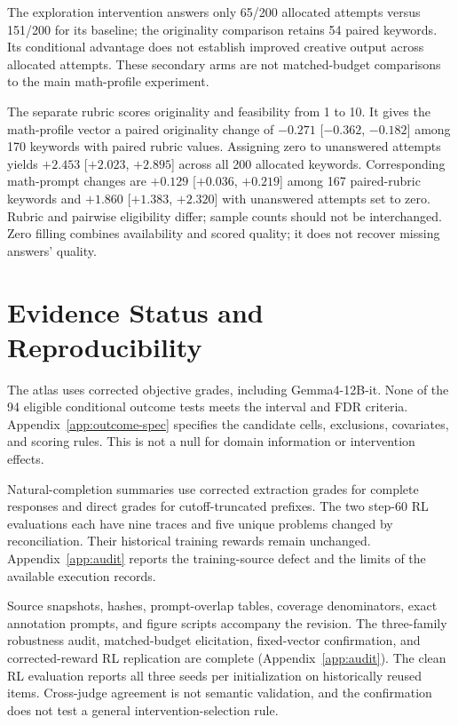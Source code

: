 The exploration intervention answers only 65/200 allocated attempts versus 151/200 for its baseline; the originality comparison retains 54 paired keywords. Its conditional advantage does not establish improved creative output across allocated attempts. These secondary arms are not matched-budget comparisons to the main math-profile experiment.

The separate rubric scores originality and feasibility from 1 to 10. It gives the math-profile vector a paired originality change of $-0.271$ [$-0.362$, $-0.182$] among 170 keywords with paired rubric values. Assigning zero to unanswered attempts yields $+2.453$ [$+2.023$, $+2.895$] across all 200 allocated keywords. Corresponding math-prompt changes are $+0.129$ [$+0.036$, $+0.219$] among 167 paired-rubric keywords and $+1.860$ [$+1.383$, $+2.320$] with unanswered attempts set to zero. Rubric and pairwise eligibility differ; sample counts should not be interchanged. Zero filling combines availability and scored quality; it does not recover missing answers' quality.

\section{Evidence Status and Reproducibility}
\label{app:status}
The atlas uses corrected objective grades, including Gemma4-12B-it. None of the 94 eligible conditional outcome tests meets the interval and FDR criteria. Appendix~\ref{app:outcome-spec} specifies the candidate cells, exclusions, covariates, and scoring rules. This is not a null for domain information or intervention effects.

Natural-completion summaries use corrected extraction grades for complete responses and direct grades for cutoff-truncated prefixes. The two step-60 RL evaluations each have nine traces and five unique problems changed by reconciliation. Their historical training rewards remain unchanged. Appendix~\ref{app:audit} reports the training-source defect and the limits of the available execution records.

Source snapshots, hashes, prompt-overlap tables, coverage denominators, exact annotation prompts, and figure scripts accompany the revision. The three-family robustness audit, matched-budget elicitation, fixed-vector confirmation, and corrected-reward RL replication are complete (Appendix~\ref{app:audit}). The clean RL evaluation reports all three seeds per initialization on historically reused items. Cross-judge agreement is not semantic validation, and the confirmation does not test a general intervention-selection rule.
